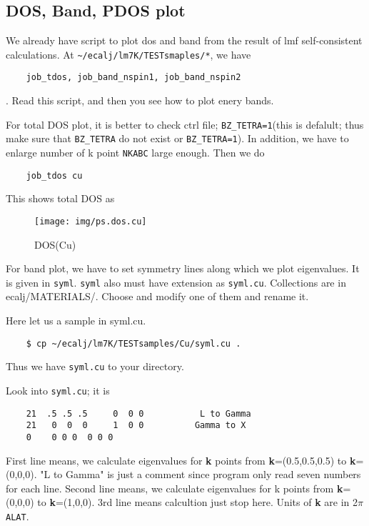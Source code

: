 \documentclass[a4paper,10pt,epsf,fleqn]{article}
\begin{document}
\subsection{DOS, Band, PDOS plot}

We already have script to plot dos and band from the result of lmf
self-consistent calculations.
At \verb+~/ecalj/lm7K/TESTsmaples/*+, we have
\begin{verbatim}
    job_tdos, job_band_nspin1, job_band_nspin2
\end{verbatim}
. Read this script, and then you see how to plot enery bands.

For total DOS plot, it is better to check ctrl file;
\verb+BZ_TETRA=1+(this is defalult; thus make sure that \verb+BZ_TETRA+ do
not exist or \verb+BZ_TETRA=1+). 
In addition, we have to enlarge number of k point \verb+NKABC+ large enough.
Then we do
\begin{verbatim}
    job_tdos cu
\end{verbatim}
This shows total DOS as
\begin{figure}[h]
 \begin{center}
  \texttt{[image: img/ps.dos.cu]}
  \vspace{5mm}
  \caption{DOS(Cu)}
 \end{center}
\end{figure}
 

For band plot, we have to set symmetry lines along which we plot eigenvalues.
It is given in \verb+syml+. \verb+syml+ also must have extension
as \verb+syml.cu+. Collections are in ecalj/MATERIALS/. Choose and
modify one of them and rename it.

Here let us a sample in syml.cu.
\begin{verbatim}
    $ cp ~/ecalj/lm7K/TESTsamples/Cu/syml.cu .
\end{verbatim}
Thus we have \verb+syml.cu+ to your directory.

Look into \verb+syml.cu+; it is
\begin{verbatim}
    21  .5 .5 .5     0  0 0           L to Gamma
    21   0  0  0     1  0 0          Gamma to X
    0    0 0 0  0 0 0
\end{verbatim}
First line means, we calculate eigenvalues 
for {\bf k} points from {\bf k}=(0.5,0.5,0.5) to {\bf k}=(0,0,0).
"L to Gamma" is just a comment since program only read 
seven numbers for each line.
Second line means, we calculate eigenvalues 
for k points from {\bf k}=(0,0,0) to {\bf k}=(1,0,0).
3rd line means calcultion just stop here.
Units of {\bf k} are in 2$\pi$\verb+ALAT+.
\end{document}
